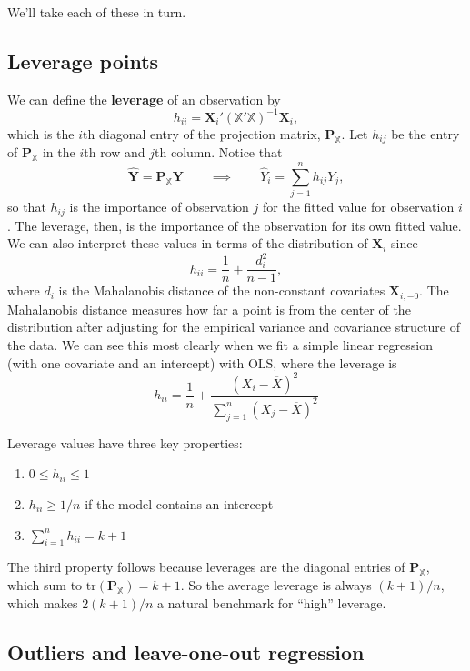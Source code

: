\documentclass[
  13pt,
  letterpaper,
  DIV=11,
  numbers=noendperiod]{scrreprt}
\providecommand{\tightlist}{%
  \setlength{\itemsep}{0pt}\setlength{\parskip}{0pt}}
\newcommand{\mb}{\bm}
\newcommand{\X}{\mb{X}}
\newcommand{\Xmat}{\mathbb{X}}
\theoremstyle{plain}
\theoremstyle{plain}
\theoremstyle{definition}
\theoremstyle{definition}
\theoremstyle{remark}
\begin{document}
We'll take each of these in turn.

\subsection{Leverage points}\label{sec-leverage}

We can define the \textbf{leverage} of an observation by \[ 
h_{ii} = \X_{i}'\left(\Xmat'\Xmat\right)^{-1}\X_{i},
\] which is the \(i\)th diagonal entry of the projection matrix,
\(\mb{P}_{\Xmat}\). Let \(h_{ij}\) be the entry of \(\mb{P}_{\Xmat}\) in
the \(i\)th row and \(j\)th column. Notice that \[ 
\widehat{\mb{Y}} = \mb{P}_{\Xmat}\mb{Y} \qquad \implies \qquad \widehat{Y}_i = \sum_{j=1}^n h_{ij}Y_j,
\] so that \(h_{ij}\) is the importance of observation \(j\) for the
fitted value for observation \(i\). The leverage, then, is the
importance of the observation for its own fitted value. We can also
interpret these values in terms of the distribution of \(\X_{i}\) since
\[
h_{ii} = \frac{1}{n} + \frac{d_i^2}{n-1},
\] where \(d_i\) is the Mahalanobis distance of the non-constant
covariates \(\X_{i,-0}\). The Mahalanobis distance measures how far a
point is from the center of the distribution after adjusting for the
empirical variance and covariance structure of the data. We can see this
most clearly when we fit a simple linear regression (with one covariate
and an intercept) with OLS, where the leverage is \[ 
h_{ii} = \frac{1}{n} + \frac{(X_i - \overline{X})^2}{\sum_{j=1}^n (X_j - \overline{X})^2}
\]

Leverage values have three key properties:

\begin{enumerate}
\def\labelenumi{\arabic{enumi}.}
\tightlist
\item
  \(0 \leq h_{ii} \leq 1\)
\item
  \(h_{ii} \geq 1/n\) if the model contains an intercept
\item
  \(\sum_{i=1}^{n} h_{ii} = k + 1\)
\end{enumerate}

The third property follows because leverages are the diagonal entries of
\(\mb{P}_{\Xmat}\), which sum to \(\text{tr}(\mb{P}_{\Xmat}) = k+1\). So
the average leverage is always \((k+1)/n\), which makes \(2(k+1)/n\) a
natural benchmark for ``high'' leverage.

\subsection{Outliers and leave-one-out
regression}\label{outliers-and-leave-one-out-regression}
\end{document}

